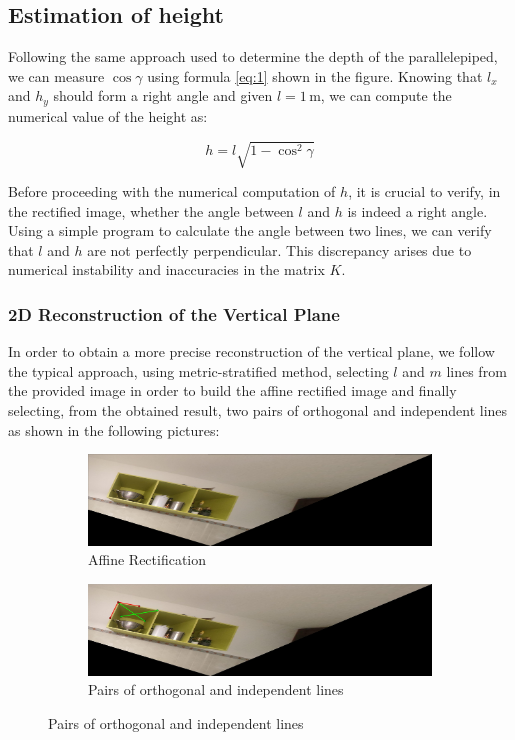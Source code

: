 \subsection{Estimation of height}
Following the same approach used to determine the depth of the parallelepiped, we can measure $\cos\gamma$ using formula \ref{eq:1} shown in the figure. Knowing that $l_x$ and $h_y$ should form a right angle and given $l = 1 \, \mathrm{m}$, we can compute the numerical value of the height as:

\[
h = l \sqrt{1 - \cos^2\gamma}
\]

Before proceeding with the numerical computation of $h$, it is crucial to verify, in the rectified image, whether the angle between $l$ and $h$ is indeed a right angle. Using a simple program to calculate the angle between two lines, we can verify that $l$ and $h$ are not perfectly perpendicular. This discrepancy arises due to numerical instability and inaccuracies in the matrix $K$.

\subsubsection{2D Reconstruction of the Vertical Plane}
In order to obtain a more precise reconstruction of the vertical plane, we follow the typical approach, using metric-stratified method, selecting $l$ and $m$ lines from the provided image in order to build the affine rectified image and finally selecting, from the obtained result, two pairs of orthogonal and independent lines as shown in the following pictures:

\begin{figure}[H]
     \centering
     \begin{subfigure}[b]{0.45\textwidth}
         \centering
         \includegraphics[width=\textwidth]{img/G3/affineVertRectification.jpg}
         \caption{Affine Rectification}
     \end{subfigure}
     \hfill
     \begin{subfigure}[b]{0.45\textwidth}
         \centering
         \includegraphics[width=\textwidth]{img/G3/affineWithLines.png}
         \caption{Pairs of orthogonal and independent lines}
         \label{pairOrthogonalLines}
     \end{subfigure}
\end{figure}

